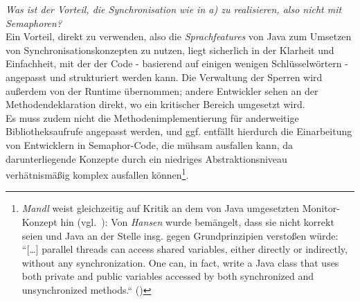 \vspace{5mm}

\noindent
\textit{Was ist der Vorteil, die Synchronisation wie in a) zu realisieren, also nicht mit
Semaphoren?}\\

\noindent
Ein Vorteil,  direkt zu verwenden, also die \textit{Sprachfeatures} von Java zum Umsetzen von Synchronisationskonzepten zu nutzen, liegt sicherlich in der Klarheit und Einfachheit, mit der der Code - basierend auf einigen wenigen Schlüsselwörtern - angepasst und strukturiert werden kann. Die Verwaltung der Sperren wird außerdem von der Runtime übernommen; andere Entwickler sehen an der Methodendeklaration direkt, wo ein kritischer Bereich umgesetzt wird.\\
Es muss zudem nicht die Methodenimplementierung für anderweitige Bibliotheksaufrufe angepasst werden, und ggf. entfällt hierdurch die Einarbeitung von Entwicklern in Semaphor-Code, die mühsam ausfallen kann, da darunterliegende Konzepte durch ein niedriges Abstraktionsniveau verhätnismäßig komplex ausfallen können\footnote{
\textit{Mandl} weist gleichzeitig  auf Kritik an dem von Java umgesetzten Monitor-Konzept hin (vgl.~\cite[162]{Man20g}): Von \textit{Hansen} wurde bemängelt, dass sie nicht korrekt seien und Java an der Stelle insg. gegen Grundprinzipien verstoßen würde: ``[\ldots] parallel threads can access shared variables, either directly or indirectly, without any synchronization. One can, in fact, write a Java class that uses both private and public variables accessed by both synchronized and unsynchronized methods.`` (\cite[42]{Han99})
}.
